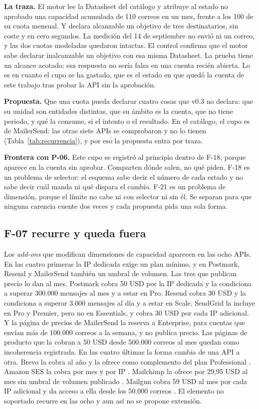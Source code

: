 \textbf{La traza.} El motor lee la Datasheet del catálogo y atribuye al estado no aprobado una capacidad acumulada de 110 correos en un mes, frente a los 100 de su cuota mensual.
Y declara alcanzable un objetivo de tres destinatarios, sin coste y en cero segundos.
La medición del 14 de septiembre no
envió ni un correo, y las dos cuotas modeladas quedaron intactas. El control
confirma que el motor sabe declarar inalcanzable un objetivo con esa misma
Datasheet. La prueba tiene un alcance acotado: esa respuesta no sería falsa en una
cuenta recién abierta. Lo es en cuanto el cupo se ha gastado, que es el estado en que quedó la cuenta de este
trabajo tras probar la API sin la aprobación.

\textbf{Propuesta.} Que una cuota pueda declarar cuatro cosas que v0.3 no declara: que su unidad son entidades distintas, que su ámbito es la cuenta, que no tiene periodo, y qué la consume, si el intento o el resultado.
En el catálogo, el cupo es de MailerSend: las otras siete APIs se comprobaron y no lo tienen (Tabla~\ref{tab:recurrencia}), y por eso la propuesta entra por traza.

\textbf{Frontera con P-06.} Este cupo se registró al principio dentro de F-18,
porque aparece en la cuenta sin aprobar. Comparten dónde salen, no qué piden. F-18
es un problema de selector: el esquema sabe decir el número de cada estado y no
sabe decir cuál manda ni qué dispara el cambio. F-21 es un problema de dimensión,
porque el límite no cabe ni con selector ni sin él. Se separan para que ninguna
carencia cuente dos veces y cada propuesta pida una sola forma.

\subsection{F-07 recurre y queda fuera}
\label{subsec:evolucion:f07}

Los \textit{add-ons} que modifican dimensiones de capacidad aparecen en las ocho APIs.
En las cuatro primeras la IP dedicada exige un plan mínimo, y en Postmark, Resend y MailerSend también un umbral de volumen.
Las tres que publican precio lo dan al mes.
Postmark cobra 50 USD por la IP dedicada y la condiciona a superar 300.000 mensajes al mes y a estar en Pro.
Resend cobra 30 USD y la condiciona a superar 3.000 mensajes al día y a estar en Scale.
SendGrid la incluye en Pro y Premier, pero no en Essentials, y cobra 30 USD por cada IP adicional.
Y la página de precios de MailerSend la reserva a Enterprise, para cuentas que envían más de 100.000 correos a la semana, y no publica precio.
Las páginas de producto que la cobran a 50 USD desde 500.000 correos al mes quedan como incoherencia registrada.
En las cuatro últimas la forma cambia de una API a otra.
Brevo la cobra al año y la ofrece como complemento del plan Professional \citep{brevopricing}.
Amazon SES la cobra por mes y por IP \citep{sespricing}.
Mailchimp la ofrece por 29,95 USD al mes sin umbral de volumen publicado \citep{mailchimppricing}.
Mailgun cobra 59 USD al mes por cada IP adicional y da acceso a ella desde los 50.000 correos \citep{mailgunpricing}.
El elemento no soportado recurre en las ocho y aun así no se propone extensión.

